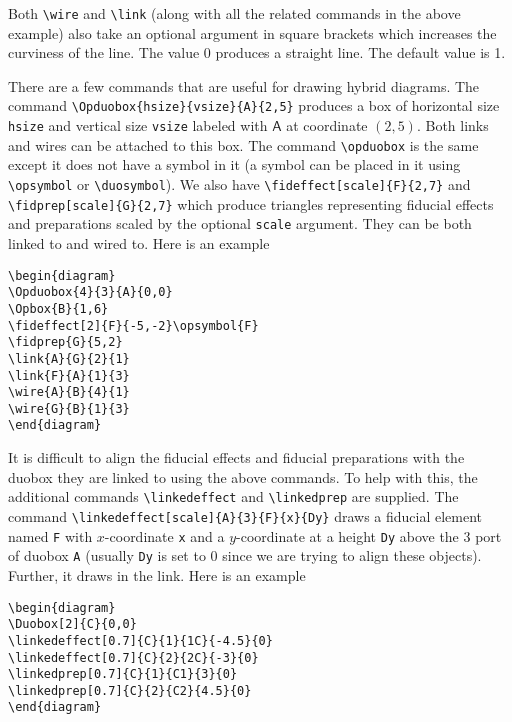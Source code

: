 \documentclass[10pt]{article}
\begin{document}
\noindent Both \verb+\wire+ and \verb+\link+ (along with all the related commands in the above example) also take an optional argument in square brackets which increases the curviness of the line.  The value 0 produces a straight line.  The default value is 1.

There are a few commands that are useful for drawing hybrid diagrams.  The command \verb+\Opduobox{hsize}{vsize}{A}{2,5}+ produces a box of horizontal size \verb+hsize+ and vertical size \verb+vsize+ labeled with $\mathsf A$ at coordinate $(2,5)$.  Both links and wires can be attached to this box.  The command \verb+\opduobox+ is the same except it does not have a symbol in it (a symbol can be placed in it using \verb+\opsymbol+ or \verb+\duosymbol+).  We also have \verb+\fideffect[scale]{F}{2,7}+ and \verb+\fidprep[scale]{G}{2,7}+ which produce triangles representing fiducial effects and preparations scaled by the optional \verb+scale+ argument.  They can be both linked to and wired to.  Here is an example
\begin{verbatim}
\begin{diagram}
\Opduobox{4}{3}{A}{0,0}
\Opbox{B}{1,6}
\fideffect[2]{F}{-5,-2}\opsymbol{F}
\fidprep{G}{5,2}
\link{A}{G}{2}{1}
\link{F}{A}{1}{3}
\wire{A}{B}{4}{1}
\wire{G}{B}{1}{3}
\end{diagram}
\end{verbatim}

\noindent It is difficult to align the fiducial effects and fiducial preparations with the duobox they are linked to using the above commands. To help with this, the additional commands \verb+\linkedeffect+ and \verb+\linkedprep+ are supplied.  The command \verb+\linkedeffect[scale]{A}{3}{F}{x}{Dy}+ draws a fiducial element named \verb+F+ with $x$-coordinate \verb+x+ and a $y$-coordinate at a height \verb+Dy+ above the 3 port of duobox \verb+A+ (usually \verb+Dy+ is set to 0 since we are trying to align these objects).  Further, it draws in the link.  Here is an example
\newpage
{}
\begin{verbatim}
\begin{diagram}
\Duobox[2]{C}{0,0}
\linkedeffect[0.7]{C}{1}{1C}{-4.5}{0}
\linkedeffect[0.7]{C}{2}{2C}{-3}{0}
\linkedprep[0.7]{C}{1}{C1}{3}{0}
\linkedprep[0.7]{C}{2}{C2}{4.5}{0}
\end{diagram}
\end{verbatim}
\end{document}
